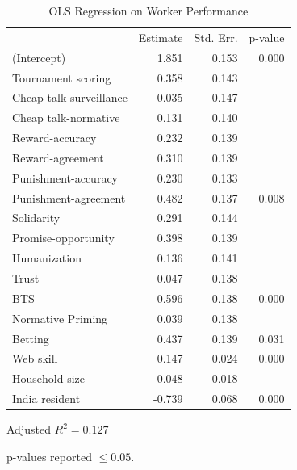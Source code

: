\documentclass{chi2009}
\begin{document}
{%
\begin{table}[ht]					%
\begin{center}						%
\caption{OLS Regression on Worker Performance} %
\vspace{8pt}
\begin{threeparttable}
\begin{tabular}{@{}l r  r r@{}}
\toprule
 & Estimate & Std. Err. & p-value\tnote{\dag}\\
\cmidrule(l){2-4}
(Intercept) & 1.851 & 0.153 & 0.000\\
Tournament scoring & 0.358 & 0.143 &\\
Cheap talk-surveillance & 0.035 & 0.147 &\\
Cheap talk-normative & 0.131 & 0.140 &\\
Reward-accuracy & 0.232 & 0.139 &\\
Reward-agreement & 0.310 & 0.139 &\\
Punishment-accuracy & 0.230 & 0.133 &\\
Punishment-agreement & 0.482 & 0.137 & 0.008\\
Solidarity & 0.291 & 0.144 &\\
Promise-opportunity & 0.398 & 0.139 &\\
Humanization & 0.136 & 0.141 &\\
Trust & 0.047 & 0.138 &\\
BTS & 0.596 & 0.138 & 0.000\\
Normative Priming & 0.039 & 0.138 &\\
Betting & 0.437 & 0.139 & 0.031\\
Web skill & 0.147 & 0.024 & 0.000\\
Household size  & -0.048 & 0.018 &\\
India resident & -0.739 & 0.068 & 0.000\\
\bottomrule
\end{tabular}
  \begin{tablenotes}[para]
	\item Adjusted $R^{2} = 0.127$\\
	\item[\dag]p-values reported $\leq 0.05$.\\
  \end{tablenotes}
\end{threeparttable}
\label{table:demog_control_model}
\end{center}
\end{table}


}
\end{document}
